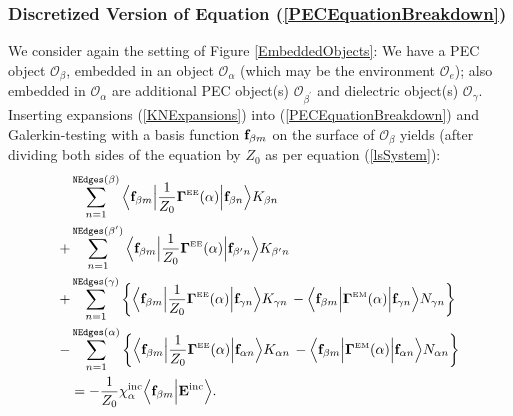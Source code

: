 \documentclass[dvips,letterpaper]{article}
\begin{document}
\subsubsection*{Discretized Version of Equation 
                (\ref{PECEquationBreakdown})}

We consider again the setting of Figure \ref{EmbeddedObjects}:
We have a PEC object $\mathcal{O}_\beta$, embedded in an object
$\mathcal{O}_\alpha$ (which may be the environment 
$\mathcal{O}_e$); also embedded in $\mathcal{O}_\alpha$ are
additional PEC object(s) $\mathcal{O}_{\beta^\prime}$ and dielectric 
object(s) $\mathcal{O}_\gamma.$ 
Inserting expansions (\ref{KNExpansions}) 
into (\ref{PECEquationBreakdown})
and Galerkin-testing with a basis function $\mathbf{f}_{\beta m}$ on 
the surface of $\mathcal{O}_\beta$ yields 
(after dividing both 
sides of the equation by $Z_0$ as per equation (\ref{lsSystem}):
\begin{align}
&\sum_{n=1}^{\texttt{NEdges}(\beta)} 
   \Big\langle 
         \mathbf{f}_{\beta m} 
   \Big| \frac{1}{Z_0} \boldsymbol{\Gamma}^{\hbox{\tiny{EE}}}(\alpha) \Big|
         \mathbf{f}_{\beta n}
   \Big\rangle 
         K_{\beta n}
\nonumber \\
+&\sum_{n=1}^{\texttt{NEdges}(\beta^\prime)} 
   \Big\langle 
         \mathbf{f}_{\beta m} 
   \Big| \frac{1}{Z_0} \boldsymbol{\Gamma}^{\hbox{\tiny{EE}}}(\alpha) \Big| 
         \mathbf{f}_{\beta^\prime n}
   \Big\rangle 
         K_{\beta^\prime n}
\nonumber \\
+&\sum_{n=1}^{\texttt{NEdges}(\gamma)} \bigg\{
   \Big\langle 
         \mathbf{f}_{\beta m} 
   \Big| \frac{1}{Z_0} \boldsymbol{\Gamma}^{\hbox{\tiny{EE}}}(\alpha) \Big| 
         \mathbf{f}_{\gamma n}
   \Big\rangle 
         K_{\gamma n}
   \,-
   \Big\langle 
         \mathbf{f}_{\beta m} 
   \Big| \boldsymbol{\Gamma}^{\hbox{\tiny{EM}}}(\alpha) \Big| 
         \mathbf{f}_{\gamma n}
   \Big\rangle 
         N_{\gamma n}
  \bigg\}
\nonumber \\
-&\sum_{n=1}^{\texttt{NEdges}(\alpha)} \bigg\{
   \Big\langle 
         \mathbf{f}_{\beta m} 
   \Big| \frac{1}{Z_0} \boldsymbol{\Gamma}^{\hbox{\tiny{EE}}}(\alpha) \Big| 
         \mathbf{f}_{\alpha n}
   \Big\rangle 
         K_{\alpha n}
   \,-
   \Big\langle 
         \mathbf{f}_{\beta m} 
   \Big| \boldsymbol{\Gamma}^{\hbox{\tiny{EM}}}(\alpha) \Big| 
         \mathbf{f}_{\alpha n}
   \Big\rangle 
         N_{\alpha n}
  \bigg\}
\nonumber \\
&=-\frac{1}{Z_0} \chi_\alpha^{\hbox{\scriptsize{inc}}} 
   \Big\langle \mathbf{f}_{\beta m} \Big| \mathbf{E}^{\hbox{\scriptsize{inc}}} \Big\rangle.
 \label{DiscretizedPECEquation}
\end{align}
\end{document}
